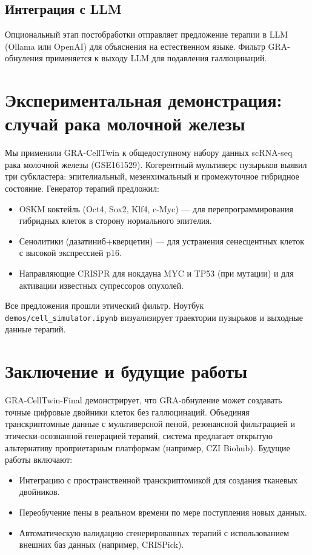 \documentclass[12pt,a4paper]{article}
\begin{document}
\subsection{Интеграция с LLM}
Опциональный этап постобработки отправляет предложение терапии в LLM (Ollama или OpenAI) для объяснения на естественном языке. Фильтр GRA-обнуления применяется к выходу LLM для подавления галлюцинаций.

\section{Экспериментальная демонстрация: случай рака молочной железы}

Мы применили GRA-CellTwin к общедоступному набору данных scRNA-seq рака молочной железы (GSE161529). Когерентный мультиверс пузырьков выявил три субкластера: эпителиальный, мезенхимальный и промежуточное гибридное состояние. Генератор терапий предложил:
\begin{itemize}
    \item OSKM коктейль (Oct4, Sox2, Klf4, c-Myc) — для перепрограммирования гибридных клеток в сторону нормального эпителия.
    \item Сенолитики (дазатиниб+кверцетин) — для устранения сенесцентных клеток с высокой экспрессией p16.
    \item Направляющие CRISPR для нокдауна MYC и TP53 (при мутации) и для активации известных супрессоров опухолей.
\end{itemize}
Все предложения прошли этический фильтр. Ноутбук \texttt{demos/cell\_simulator.ipynb} визуализирует траектории пузырьков и выходные данные терапий.

\section{Заключение и будущие работы}
GRA-CellTwin-Final демонстрирует, что GRA-обнуление может создавать точные цифровые двойники клеток без галлюцинаций. Объединяя транскриптомные данные с мультиверсной пеной, резонансной фильтрацией и этически-осознанной генерацией терапий, система предлагает открытую альтернативу проприетарным платформам (например, CZI Biohub). Будущие работы включают:
\begin{itemize}
    \item Интеграцию с пространственной транскриптомикой для создания тканевых двойников.
    \item Переобучение пены в реальном времени по мере поступления новых данных.
    \item Автоматическую валидацию сгенерированных терапий с использованием внешних баз данных (например, CRISPick).
\end{itemize}
\end{document}
